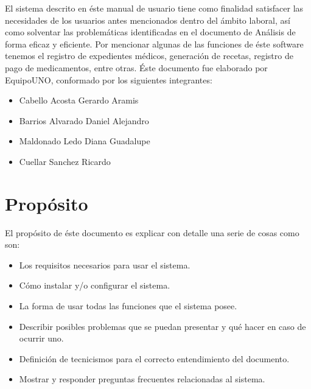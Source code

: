 

El sistema descrito en \'este manual de usuario tiene como finalidad satisfacer las necesidades de los usuarios antes mencionados dentro del \'ambito laboral, as\'i como solventar las problem\'aticas identificadas en el documento de An\'alisis de forma eficaz y eficiente. Por mencionar algunas de las funciones de \'este software tenemos el registro de expedientes m\'edicos, generaci\'on de recetas, registro de pago de medicamentos, entre otras.
\'Este documento fue elaborado por EquipoUNO, conformado por los siguientes integrantes:
\begin{itemize}
\item Cabello Acosta Gerardo Aramis
\item Barrios Alvarado Daniel Alejandro
\item Maldonado Ledo Diana Guadalupe
\item Cuellar Sanchez Ricardo
\end{itemize}

\section{Propósito}
El prop\'osito de \'este documento es explicar con detalle una serie de cosas como son:
\begin{itemize}
\item Los requisitos necesarios para usar el sistema.
\item C\'omo instalar y/o configurar el sistema.
\item La forma de usar todas las funciones que el sistema posee.
\item Describir posibles problemas que se puedan presentar y qu\'e hacer en caso de ocurrir uno.
\item Definici\'on de tecnicismos para el correcto entendimiento del documento.
\item Mostrar y responder preguntas frecuentes relacionadas al sistema.

\end{itemize}


